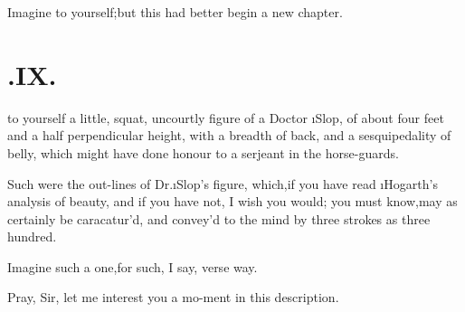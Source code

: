 \documentclass[twoside]{article}
\begin{document}
Imagine to yourself;\tsk but this had\break
better begin a new chapter.

\section{\chapstrut{}.\enspace  IX.}

 to yourself a little, squat, uncourtly figure of a Doctor
\i{Slop}, of\break
about four feet and a half perpendicular
height, with a breadth of back, and a sesqui\-pedality of belly, which might have done honour to a serjeant in
the horse-guards.

Such were the out-lines of Dr.\@ \i{Slop}’s figure, which,\tsk if you have read
\i{Ho\-garth}’s analysis of beauty, and if you have not, I wish you would;\tsk
you must know,\break may as certainly be caracatur’d, and convey’d to the mind by three
strokes as three hundred.

Imagine such a one,\tsk for such, I say,
verse way.

Pray, Sir, let me interest you a mo-\break ment in this description.
\end{document}
